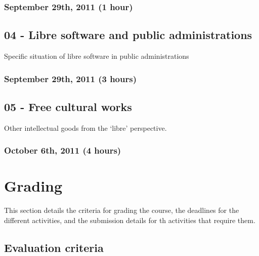 \documentclass[a4paper]{article}
\begin{document}
\subsubsection{September 29th, 2011 (1 hour)}


\subsection{04 - Libre software and public administrations}

Specific situation of libre software in public administrations

\subsubsection{September 29th, 2011 (3 hours)}

\subsection{05 - Free cultural works}

Other intellectual goods from the `libre' perspective.


\subsubsection{October 6th, 2011 (4 hours)}


\section{Grading}

This section details the criteria for grading the course, the deadlines for the different activities, and the submission details for th activities that require them.

\subsection{Evaluation criteria}
\label{sub:evaluation-criteria}
\end{document}
